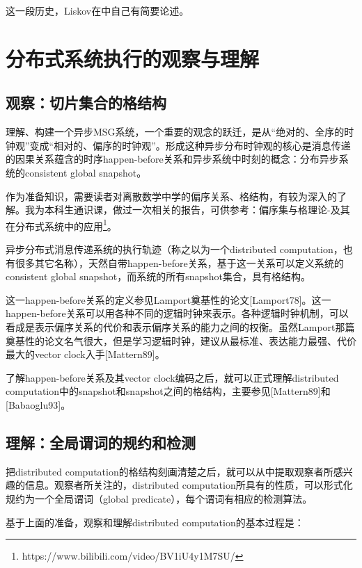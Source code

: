\documentclass[UTF8]{ctexrep}
\begin{document}
这一段历史，Liskov在\cite[Chp. 7]{Charron10}中自己有简要论述。



\chapter{分布式系统执行的观察与理解}

\section{观察：切片集合的格结构}

理解、构建一个异步MSG系统，一个重要的观念的跃迁，是从“绝对的、全序的时钟观”变成“相对的、偏序的时钟观”。形成这种异步分布时钟观的核心是消息传递的因果关系蕴含的时序happen-before关系和异步系统中时刻的概念：分布异步系统的consistent global snapshot。

作为准备知识，需要读者对离散数学中学的偏序关系、格结构，有较为深入的了解。我为本科生通识课，做过一次相关的报告，可供参考：偏序集与格理论-及其在分布式系统中的应用\footnote{https://www.bilibili.com/video/BV1iU4y1M7SU/}。

异步分布式消息传递系统的执行轨迹（称之以为一个distributed computation，也有很多其它名称），天然自带happen-before关系，基于这一关系可以定义系统的consistent global snapshot，而系统的所有snapshot集合，具有格结构。

这一happen-before关系的定义参见Lamport奠基性的论文[Lamport78]。这一happen-before关系可以用各种不同的逻辑时钟来表示。各种逻辑时钟机制，可以看成是表示偏序关系的代价和表示偏序关系的能力之间的权衡。虽然Lamport那篇奠基性的论文名气很大，但是学习逻辑时钟，建议从最标准、表达能力最强、代价最大的vector clock入手[Mattern89]。

了解happen-before关系及其vector clock编码之后，就可以正式理解distributed computation中的snapshot和snapshot之间的格结构，主要参见[Mattern89]和[Babaoglu93]。

\section{理解：全局谓词的规约和检测}

把distributed computation的格结构刻画清楚之后，就可以从中提取观察者所感兴趣的信息。观察者所关注的，distributed computation所具有的性质，可以形式化规约为一个全局谓词（global predicate），每个谓词有相应的检测算法。

基于上面的准备，观察和理解distributed computation的基本过程是：
\end{document}
